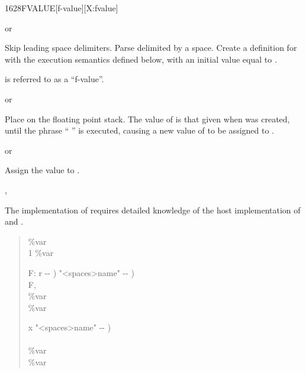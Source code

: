 \begin{worddef}{1628}{FVALUE}[f-value][X:fvalue]
\item {}  or

	Skip leading space delimiters.  Parse  delimited by a
	space.  Create a definition for  with the execution
	semantics defined below, with an initial value equal to .

	 is referred to as a ``f-value''.

\execute[name]
	 or 

	Place  on the floating point stack.  The value of
	 is that given when  was created, until the
	phrase ``  '' is executed, causing
	a new value of  to be assigned to .

	 or 

	Assign the value  to .

\see {}, 

	\begin{implement}
		\dffamily
		The implementation of  requires detailed
		knowledge of the host implementation of  and
		.

		\begin{quote}\ttfamily
			 \%var \\
			\word{:}  1 \%var \word{!} \word{;}

			\word{:}   F: r -{}- )  "<spaces>name" -{}- ) \\
			\tab {} F, \\
			\tab {} \%var       \\
			 \%var \word{!} \word{;}

			\word{:}   x "<spaces>name" -{}- ) \\
			\tab {} \word{,} \\
			\tab {} \%var   ~\word{!}  ~  \\
			 \%var \word{!} \word{;}
		\end{quote}
	\end{implement}


\end{worddef}
